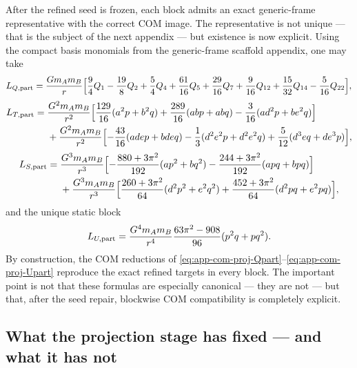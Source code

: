 \documentclass[11pt]{article}
\begin{document}
After the refined seed is frozen, each block admits an exact generic-frame
representative with the correct COM image.  The representative is not unique ---
that is the subject of the next appendix --- but existence is now explicit.
Using the compact basis monomials from the generic-frame scaffold appendix, one
may take
\begin{equation}
L_{Q,\rm part}
=
\frac{Gm_A m_B}{r}
\Bigl[
\frac94 Q_1
-\frac{19}{8}Q_2
+\frac54 Q_4
+\frac{61}{16}Q_5
+\frac{29}{16}Q_7
+\frac{9}{16}Q_{12}
+\frac{15}{32}Q_{14}
-\frac{5}{16}Q_{22}
\Bigr],
\label{eq:app-com-proj-Qpart}
\end{equation}
\begin{equation}
\begin{aligned}
L_{T,\rm part}
={}&
\frac{G^2m_A m_B}{r^2}
\Bigl[
\frac{129}{16}(a^2p+b^2q)
+\frac{289}{16}(abp+abq)
-\frac{3}{16}(ad^2p+be^2q)
\Bigr]
\\
&
+\frac{G^2m_A m_B}{r^2}
\Bigl[
-\frac{43}{16}(adep+bdeq)
-\frac13(d^2e^2p+d^2e^2q)
+\frac{5}{12}(d^3eq+de^3p)
\Bigr],
\end{aligned}
\label{eq:app-com-proj-Tpart}
\end{equation}
\begin{equation}
\begin{aligned}
L_{S,\rm part}
={}&
\frac{G^3m_A m_B}{r^3}
\Bigl[
-\frac{880+3\pi^2}{192}(ap^2+bq^2)
-\frac{244+3\pi^2}{192}(apq+bpq)
\Bigr]
\\
&
+\frac{G^3m_A m_B}{r^3}
\Bigl[
\frac{260+3\pi^2}{64}(d^2p^2+e^2q^2)
+\frac{452+3\pi^2}{64}(d^2pq+e^2pq)
\Bigr],
\end{aligned}
\label{eq:app-com-proj-Spart}
\end{equation}
and the unique static block
\begin{equation}
L_{U,\rm part}
=
\frac{G^4m_A m_B}{r^4}
\frac{63\pi^2-908}{96}(p^2q+pq^2).
\label{eq:app-com-proj-Upart}
\end{equation}
By construction, the COM reductions of
\eqref{eq:app-com-proj-Qpart}--\eqref{eq:app-com-proj-Upart} reproduce the exact
refined targets in every block.  The important point is not that these formulas
are especially canonical --- they are not --- but that, after the seed repair,
blockwise COM compatibility is completely explicit.

\subsection{What the projection stage has fixed --- and what it has not}
\label{app:com-proj-ledger}
\end{document}
